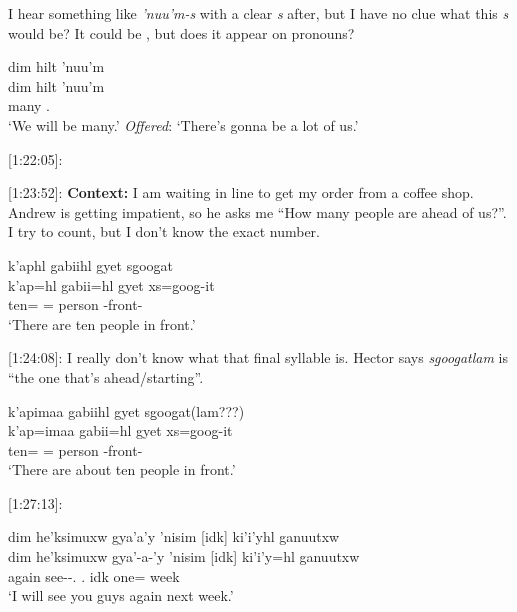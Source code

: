 I hear something like \textit{'nuu'm-s} with a clear \textit{s} after, but I have no clue what this \textit{s} would be? It could be \Val{}, but does it appear on pronouns?

\begin{exe}
    \ex \glll dim hilt 'nuu'm \\
    dim hilt 'nuu'm \\
    \Prosp{} many \Fpl{}.\Iii{} \\
    `We will be many.' \textit{Offered}: `There's gonna be a lot of us.'
\end{exe}

[1:22:05]:

\begin{exe}
    \ex 
    \begin{xlist}
    \end{xlist}
    
\end{exe}

[1:23:52]: \textbf{Context: } I am waiting in line to get my order from a coffee shop. Andrew is getting impatient, so he asks me “How many people are ahead of us?”. I try to count, but I don't know the exact number.

\begin{exe}
    \ex \glll k'aphl gabiihl gyet sg̱oog̱at \\
    k'ap=hl gabii=hl gyet xs=g̱oog̱-it  \\
    ten=\Cn{} \Cnt{}=\Cn{} person \Supr{}-front-\Sx{} \\
    `There are ten people in front.'
\end{exe}

[1:24:08]: I really don't know what that final syllable is. Hector says \textit{sg̱oog̱atlam} is ``the one that's ahead/starting''.

\begin{exe}
    \ex \glll k'apimaa gabiihl gyet sg̱oog̱at(lam???) \\
    k'ap=imaa gabii=hl gyet xs=g̱oog̱-it  \\
    ten=\Epis{} \Cnt{}=\Cn{} person \Supr{}-front-\Sx{} \\
    `There are about ten people in front.'
\end{exe}

[1:27:13]: 

\begin{exe}
    \ex \glll dim he'ksimuxw gya'a'y 'nisim [idk] ki'i'yhl ganuutxw\\
    dim he'ksimuxw gya'-a-'y 'nisim [idk] ki'i'y=hl ganuutxw \\
    \Prosp{} again see-\Tr{}-\Fsg{}.\Ii{} \Spl{}.\Iii{} idk one=\Cn{} week \\
    `I will see you guys again next week.'
\end{exe}

